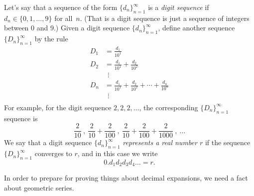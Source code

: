 \documentclass[12pt]{amsart}
\numberwithin{equation}{section}
\theoremstyle{plain} %
\theoremstyle{definition}
\theoremstyle{remark}
\begin{document}
 Let's say that a sequence of the form $\{d_n\}_{n=1}^\infty$ is a \emph{digit sequence} if $d_n\in \{0,1,\dots, 9\}$ for all~$n$. (That is a digit sequence is just a sequence of integers between $0$ and $9$.) Given a digit sequence $\{d_n\}_{n=1}^\infty$, define another sequence $\{D_n\}_{n=1}^\infty$ by the rule
\[ \begin{aligned} D_1 &= \frac{d_1}{10^1}\\
D_2 &= \frac{d_1}{10^1} + \frac{d_2}{10^2}\\
& \ \ \vdots\\
D_n& = \frac{d_1}{10^1} + \frac{d_2}{10^2} + \cdots + \frac{d_n}{10^n}\\
& \ \ \vdots \\
\end{aligned}\]
For example, for the digit sequence $2,2,2,\dots$, the corresponding $\{D_n\}_{n=1}^\infty$ sequence is
\[ \frac{2}{10} \ , \ \frac{2}{10} + \frac{2}{100}  \ ,  \  \frac{2}{10} + \frac{2}{100} + \frac{2}{1000} \ , \ \dots\]
We say that a digit sequence $\{d_n\}_{n=1}^\infty$ \emph{represents a real number $r$} if the sequence $\{ D_n\}_{n=1}^\infty$ converges to $r$, and in this case we write
\[ 0.d_1 d_2 d_3 d_4 \dots = r.\]


 In order to prepare for proving things about decimal expansions, we need a fact about geometric series.
\end{document}
